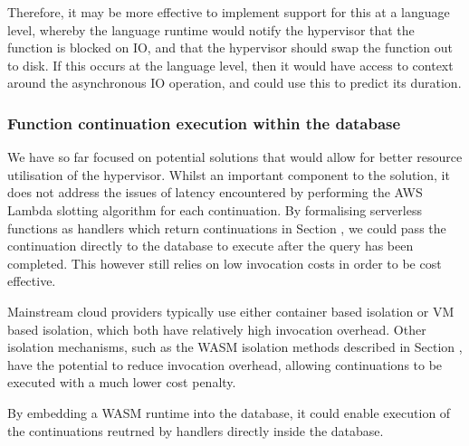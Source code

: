 Therefore, it may be more effective to implement support for this at a language level, whereby the language runtime would notify the hypervisor that the function is blocked on IO, and that the hypervisor should swap the function out to disk. If this occurs at the language level, then it would have access to context around the asynchronous IO operation, and could use this to predict its duration.

\subsubsection{Function continuation execution within the database}
We have so far focused on potential solutions that would allow for better resource utilisation of the hypervisor. Whilst an important component to the solution, it does not address the issues of latency encountered by performing the AWS Lambda slotting algorithm for each continuation. By formalising serverless functions as handlers which return continuations in Section , we could pass the continuation directly to the database to execute after the query has been completed. This however still relies on low invocation costs in order to be cost effective.

Mainstream cloud providers typically use either container based isolation or VM based isolation, which both have relatively high invocation overhead. Other isolation mechanisms, such as the WASM isolation methods described in Section , have the potential to reduce invocation overhead, allowing continuations to be executed with a much lower cost penalty.

By embedding a WASM runtime into the database, it could enable execution of the continuations reutrned by \faaasc{} handlers directly inside the database.
